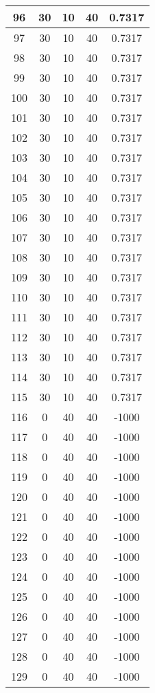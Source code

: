 \documentclass[letterpaper, 12pt]{article}
\begin{document}
\begin{longtable}{|c|c|c|c|c|}
96 & 30 & 10 & 40 & 0.7317 \\
\hline
97 & 30 & 10 & 40 & 0.7317 \\
\hline
98 & 30 & 10 & 40 & 0.7317 \\
\hline
99 & 30 & 10 & 40 & 0.7317 \\
\hline
100 & 30 & 10 & 40 & 0.7317 \\
\hline
101 & 30 & 10 & 40 & 0.7317 \\
\hline
102 & 30 & 10 & 40 & 0.7317 \\
\hline
103 & 30 & 10 & 40 & 0.7317 \\
\hline
104 & 30 & 10 & 40 & 0.7317 \\
\hline
105 & 30 & 10 & 40 & 0.7317 \\
\hline
106 & 30 & 10 & 40 & 0.7317 \\
\hline
107 & 30 & 10 & 40 & 0.7317 \\
\hline
108 & 30 & 10 & 40 & 0.7317 \\
\hline
109 & 30 & 10 & 40 & 0.7317 \\
\hline
110 & 30 & 10 & 40 & 0.7317 \\
\hline
111 & 30 & 10 & 40 & 0.7317 \\
\hline
112 & 30 & 10 & 40 & 0.7317 \\
\hline
113 & 30 & 10 & 40 & 0.7317 \\
\hline
114 & 30 & 10 & 40 & 0.7317 \\
\hline
115 & 30 & 10 & 40 & 0.7317 \\
\hline
116 & 0 & 40 & 40 & -1000 \\
\hline
117 & 0 & 40 & 40 & -1000 \\
\hline
118 & 0 & 40 & 40 & -1000 \\
\hline
119 & 0 & 40 & 40 & -1000 \\
\hline
120 & 0 & 40 & 40 & -1000 \\
\hline
121 & 0 & 40 & 40 & -1000 \\
\hline
122 & 0 & 40 & 40 & -1000 \\
\hline
123 & 0 & 40 & 40 & -1000 \\
\hline
124 & 0 & 40 & 40 & -1000 \\
\hline
125 & 0 & 40 & 40 & -1000 \\
\hline
126 & 0 & 40 & 40 & -1000 \\
\hline
127 & 0 & 40 & 40 & -1000 \\
\hline
128 & 0 & 40 & 40 & -1000 \\
\hline
129 & 0 & 40 & 40 & -1000 \\

\end{longtable}
\end{document}
